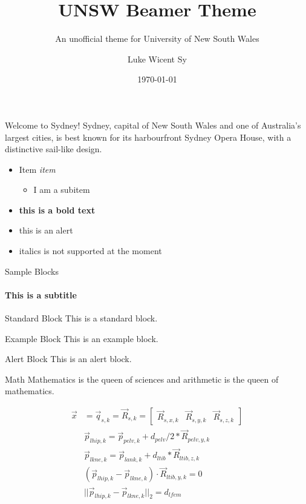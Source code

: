 \documentclass[aspectratio=169]{beamer}
\author{Luke Wicent Sy}
\title{UNSW Beamer Theme}
\subtitle{An unofficial theme for University of New South Wales}
\institute{Graduate School of Biomedical Engineering}
\date{\today}
\begin{document}
	\begin{frame}[plain]
		\titlepage
	\end{frame}
	
	\begin{frame}{Welcome to Sydney!}
	Sydney, capital of New South Wales and one of Australia's largest cities, is best known for its harbourfront Sydney Opera House, with a distinctive sail-like design.
		\begin{itemize}
			\item Item \textit{item}
				\begin{itemize}
					\item I am a subitem
				\end{itemize}
			\item \textbf{this is a bold text}
			\item \alert{this is an alert}
			\item italics is not supported at the moment
		\end{itemize}
	\end{frame}

	\begin{frame}{Sample Blocks}
		\framesubtitle{This is a subtitle}
		\begin{block}{Standard Block}
			This is a standard block.
		\end{block}
		
		\begin{exampleblock}{Example Block}
			This is an example block.
		\end{exampleblock}
		
		\begin{alertblock}{Alert Block}
			This is an alert block.
		\end{alertblock}
	\end{frame}
	
	\begin{frame}{Math}
		Mathematics is the queen of sciences and arithmetic is the queen of mathematics.

		\begin{align*}
			\vec{x} &= \vec{q}_{s, k} = \vec{R}_{s, k} = 
			\begin{bmatrix}
			\vec{R}_{s, x, k} & \vec{R}_{s, y, k} & \vec{R}_{s, z, k}
			\end{bmatrix} \\
			& \vec{p}_{lhip, k} = \vec{p}_{pelv, k} + d_{pelv}/2*\vec{R}_{pelv, y, k} \\
			& \vec{p}_{lkne, k} = \vec{p}_{lank, k} + d_{ltib}*\vec{R}_{ltib, z, k} \\
			& (\vec{p}_{lhip, k} - \vec{p}_{lkne, k} ) \cdot \vec{R}_{ltib, y, k} = 0\\
			& ||\vec{p}_{lhip, k} - \vec{p}_{lkne, k}||_2 = d_{lfem}
		\end{align*}	
		
		
	\end{frame}
\end{document}
